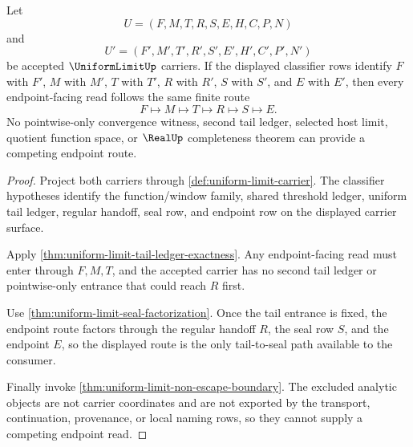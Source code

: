 \begin{theorem}
\label{thm:uniform-limit-tail-seal-route-uniqueness}
Let
$$
U=(F,M,T,R,S,E,H,C,P,N)
$$
and
$$
U'=(F',M',T',R',S',E',H',C',P',N')
$$
be accepted $\UniformLimitUp$ carriers. If the displayed classifier rows
identify $F$ with $F'$, $M$ with $M'$, $T$ with $T'$, $R$ with $R'$, $S$ with
$S'$, and $E$ with $E'$, then every endpoint-facing read follows the same
finite route
$$
F \longmapsto M \longmapsto T \longmapsto R \longmapsto S \longmapsto E.
$$
No pointwise-only convergence witness, second tail ledger, selected host
limit, quotient function space, or $\RealUp$ completeness theorem can provide
a competing endpoint route.
\end{theorem}
\begin{proof}
Project both carriers through \autoref{def:uniform-limit-carrier}. The
classifier hypotheses identify the function/window family, shared threshold
ledger, uniform tail ledger, regular handoff, seal row, and endpoint row on
the displayed carrier surface.

Apply \autoref{thm:uniform-limit-tail-ledger-exactness}. Any endpoint-facing
read must enter through $F,M,T$, and the accepted carrier has no second tail
ledger or pointwise-only entrance that could reach $R$ first.

Use \autoref{thm:uniform-limit-seal-factorization}. Once the tail entrance is
fixed, the endpoint route factors through the regular handoff $R$, the seal
row $S$, and the endpoint $E$, so the displayed route is the only
tail-to-seal path available to the consumer.

Finally invoke \autoref{thm:uniform-limit-non-escape-boundary}. The excluded
analytic objects are not carrier coordinates and are not exported by the
transport, continuation, provenance, or local naming rows, so they cannot
supply a competing endpoint read.
\end{proof}

